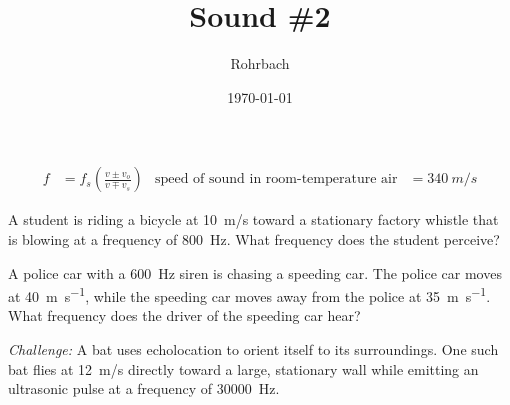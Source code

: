 \documentclass[10pt]{exam}
\title{Sound \#2}
\author{Rohrbach}
\date{\today}
\begin{document}
\maketitle

\begin{align*}
  f &= f_s \left( \frac{v\pm v_o}{v\mp v_s} \right) &
  \text{speed of sound in room-temperature air} &= \SI{340}{m/s}
\end{align*}

\begin{questions}
  \question
    A student is riding a bicycle at 10~m/s toward a stationary factory whistle that is blowing at a frequency of 800~Hz. What frequency does the student perceive? \vs

  \question
    A police car with a \SI{600}{\hertz} siren is chasing a speeding car. The police car moves at \SI{40}{\meter\per\second}, while the speeding car moves away from the police at \SI{35}{\meter\per\second}. What frequency does the driver of the speeding car hear? \vs


  \question \emph{Challenge:}
    A bat uses echolocation to orient itself to its surroundings.  One such bat flies at \SI{12}{m/s} directly toward a large, stationary wall while emitting an ultrasonic pulse at a frequency of \SI{30000}{Hz}.
    

\end{questions}
\end{document}
